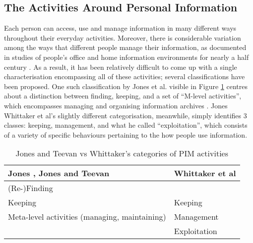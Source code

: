 \documentclass[runningheads,a4paper]{llncs}
\begin{document}


\subsection{The Activities Around Personal Information}

Each person can access, use and manage information in many different ways throughout their everyday activities.  Moreover, there is considerable variation among the ways that different people manage their information, as documented in studies of people's office and home information environments for nearly a half century \cite{filerspilers}.  As a result, it has been relatively difficult to come up with a single characterisation encompassing all of these activities; several classifications have been proposed.  One such classification by Jones et al. visible in Figure \ref{fig:pimactivities} centres about a distinction between finding, keeping, and a set of ``M-level activities'', which encompasses managing and organising information archives \cite{kftf}. Jones Whittaker et al's slightly different categorisation, meanwhile, simply identifies 3 classes: keeping, management, and what he called ``exploitation'', which consists of a variety of specific behaviours pertaining to the how people use information.  

\begin{table}
\begin{center}
\begin{tabular}{p{4.5cm} | p{4.5cm}} 
Jones \cite{jones}, Jones and Teevan \cite{jonesteevan}& Whittaker et al \cite{whittaker}\\
\hline
(Re-)Finding &  \\
Keeping & Keeping \\
Meta-level activities (managing, maintaining) & Management \\
 & Exploitation \\
\end{tabular}
\caption{Jones and Teevan vs Whittaker's categories of PIM activities}
\label{fig:pimactivities}
\end{center}
\end{table}
\end{document}
